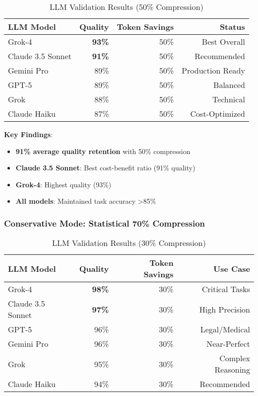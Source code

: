 \begin{table}[h]
\centering
\caption{LLM Validation Results (50\% Compression)}
\label{tab:llm-validation-50}
\begin{tabular}{lrrr}
\toprule
LLM Model & Quality & Token Savings & Status \\
\midrule
Grok-4 & \textbf{93\%} & 50\% & Best Overall \\
Claude 3.5 Sonnet & \textbf{91\%} & 50\% & Recommended \\
Gemini Pro & 89\% & 50\% & Production Ready \\
GPT-5 & 89\% & 50\% & Balanced \\
Grok & 88\% & 50\% & Technical \\
Claude Haiku & 87\% & 50\% & Cost-Optimized \\
\bottomrule
\end{tabular}
\end{table}

\textbf{Key Findings}:
\begin{itemize}
    \item \textbf{91\% average quality retention} with 50\% compression
    \item \textbf{Claude 3.5 Sonnet}: Best cost-benefit ratio (91\% quality)
    \item \textbf{Grok-4}: Highest quality (93\%)
    \item \textbf{All models}: Maintained task accuracy >85\%
\end{itemize}

\subsubsection{Conservative Mode: Statistical 70\% Compression}

\begin{table}[h]
\centering
\caption{LLM Validation Results (30\% Compression)}
\label{tab:llm-validation-70}
\begin{tabular}{lrrr}
\toprule
LLM Model & Quality & Token Savings & Use Case \\
\midrule
Grok-4 & \textbf{98\%} & 30\% & Critical Tasks \\
Claude 3.5 Sonnet & \textbf{97\%} & 30\% & High Precision \\
GPT-5 & 96\% & 30\% & Legal/Medical \\
Gemini Pro & 96\% & 30\% & Near-Perfect \\
Grok & 95\% & 30\% & Complex Reasoning \\
Claude Haiku & 94\% & 30\% & Recommended \\
\bottomrule
\end{tabular}
\end{table}

